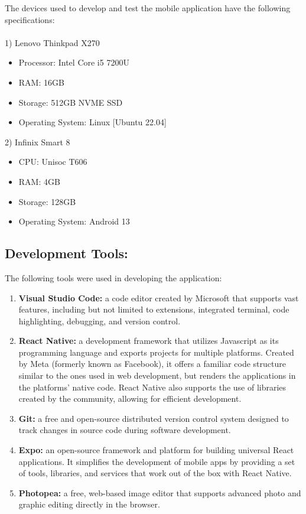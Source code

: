 \documentclass{icsthesis}
\begin{document}
\begin{mainmatter}
The devices used to develop and test the mobile application have the following specifications:\\\\
1) Lenovo Thinkpad X270
\begin{itemize}
  \item Processor: Intel Core i5 7200U
  \item RAM: 16GB
  \item Storage: 512GB NVME SSD
  \item Operating System: Linux [Ubuntu 22.04]
\end{itemize}
2) Infinix Smart 8
\begin{itemize}
  \item CPU: Unisoc T606
  \item RAM: 4GB
  \item Storage: 128GB
  \item Operating System: Android 13\\
\end{itemize}


\subsection{Development Tools:}
The following tools were used in developing the application:
\begin{enumerate}
   \item \textbf{Visual Studio Code:} a code editor created by Microsoft that supports vast features, including but not limited to extensions, integrated terminal, code highlighting, debugging, and version control.
   \item \textbf{React Native:} a development framework that utilizes Javascript as its programming language and exports projects for multiple platforms. Created by Meta (formerly known as Facebook), it offers a familiar code structure similar to the ones used in web development, but renders the applications in the platforms’ native code. React Native also supports the use of libraries created by the community, allowing for efficient development.
   \item \textbf{Git:} a free and open-source distributed version control system designed to track changes in source code during software development.
   \item \textbf{Expo:} an open-source framework and platform for building universal React applications. It simplifies the development of mobile apps by providing a set of tools, libraries, and services that work out of the box with React Native.
   \item \textbf{Photopea:} a free, web-based image editor that supports advanced photo and graphic editing directly in the browser.
   


\end{enumerate}
\end{mainmatter}
\end{document}
